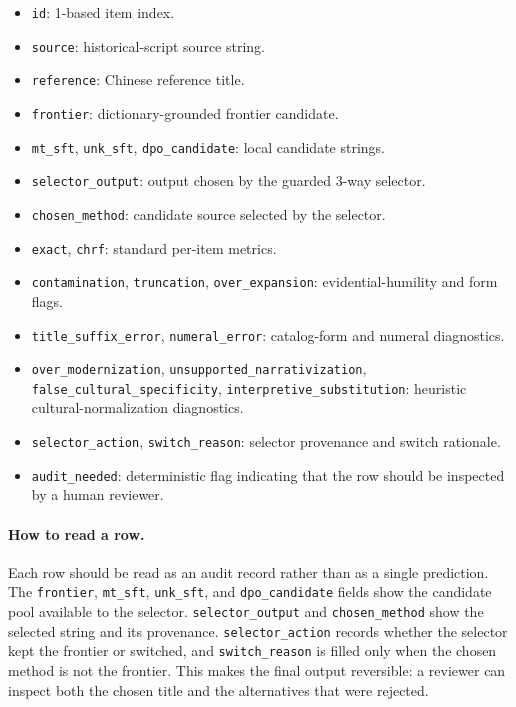 \documentclass{article}
\newcommand{\code}[1]{\texttt{#1}}
\begin{document}
\begin{itemize}
    \item \code{id}: 1-based item index.
    \item \code{source}: historical-script source string.
    \item \code{reference}: Chinese reference title.
    \item \code{frontier}: dictionary-grounded frontier candidate.
    \item \code{mt\_sft}, \code{unk\_sft}, \code{dpo\_candidate}: local candidate strings.
    \item \code{selector\_output}: output chosen by the guarded 3-way selector.
    \item \code{chosen\_method}: candidate source selected by the selector.
    \item \code{exact}, \code{chrf}: standard per-item metrics.
    \item \code{contamination}, \code{truncation}, \code{over\_expansion}: evidential-humility and form flags.
    \item \code{title\_suffix\_error}, \code{numeral\_error}: catalog-form and numeral diagnostics.
    \item \code{over\_modernization}, \code{unsupported\_narrativization}, \code{false\_cultural\_specificity}, \code{interpretive\_substitution}: heuristic cultural-normalization diagnostics.
    \item \code{selector\_action}, \code{switch\_reason}: selector provenance and switch rationale.
    \item \code{audit\_needed}: deterministic flag indicating that the row should be inspected by a human reviewer.
\end{itemize}

\paragraph{How to read a row.}
Each row should be read as an audit record rather than as a single prediction. The \code{frontier}, \code{mt\_sft}, \code{unk\_sft}, and \code{dpo\_candidate} fields show the candidate pool available to the selector. \code{selector\_output} and \code{chosen\_method} show the selected string and its provenance. \code{selector\_action} records whether the selector kept the frontier or switched, and \code{switch\_reason} is filled only when the chosen method is not the frontier. This makes the final output reversible: a reviewer can inspect both the chosen title and the alternatives that were rejected.
\end{document}
